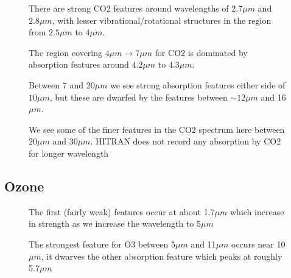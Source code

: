 \documentclass[12pt]{article}
\begin{document}
\vspace*{11.5cm}
\begin{figure}[htb]
\caption{There are strong CO2 features around wavelengths of $2.7\mu m$ and $2.8\mu m$, 
with lesser vibrational/rotational structures in the region from $2.5 \mu m$ to $4\mu m$.}
\end{figure}
\newpage

\vspace*{11.5cm}
\begin{figure}[htb]
\caption{The region covering $4\mu m \rightarrow 7\mu m$
 for CO2 is dominated by absorption features around $4.2 \mu m$ to $4.3\mu m$.}
\end{figure}
\newpage


\vspace*{11.5cm}
\begin{figure}[htb]
\caption{Between 7 and $20\mu m$ we see strong absorption features either side of $10 \mu m$, but 
these are dwarfed by the features between $\sim 12 \mu m$ and 16$\mu m$.}
\end{figure}
\newpage


\vspace*{11.5cm}
\begin{figure}[htb]
\caption{We see some of the finer features in the CO2 spectrum here
between  $20 \mu m$ and 30$\mu m$. HITRAN does not record any absorption by CO2 for longer wavelength}
\end{figure}
\newpage

\subsection{Ozone}

\vspace*{13.5cm}
\begin{figure}[htb]
\caption{The first (fairly weak) features occur at about 1.7$\mu m$
  which increase in strength as we increase the wavelength to 5$\mu m$}
\end{figure}
\newpage

\vspace*{11.5cm}
\begin{figure}[htb]
\caption{The strongest feature for O3 between $5 \mu m$ and 11$\mu m$
occurs near 10$\mu m$, it dwarves the other absorption feature which peaks at roughly 5.7$\mu m$}
\end{figure}
\newpage
\end{document}
